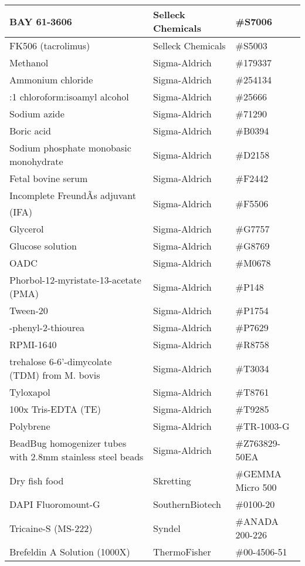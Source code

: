 \begin{center}
\begin{longtable}{|>{\raggedright\arraybackslash}m{3in}|>{\raggedleft\arraybackslash}m{1.5in}|>{\raggedright\arraybackslash}m{1in}|}
\hline
BAY 61-3606 & Selleck Chemicals & \#S7006 \\
\hline
FK506 (tacrolimus) & Selleck Chemicals & \#S5003 \\ 
\hline
Methanol & Sigma-Aldrich & \#179337 \\ 
\hline 
Ammonium chloride & Sigma-Aldrich & \#254134 \\ 
\hline 
24:1 chloroform:isoamyl alcohol & Sigma-Aldrich & \#25666 \\ 
\hline 
Sodium azide & Sigma-Aldrich  & \#71290 \\ 
\hline 
Boric acid & Sigma-Aldrich  & \#B0394 \\ 
\hline 
Sodium phosphate monobasic monohydrate & Sigma-Aldrich  & \#D2158 \\ 
\hline 
Fetal bovine serum & Sigma-Aldrich  & \#F2442 \\ 
\hline 
Incomplete FreundÃs adjuvant (IFA) & Sigma-Aldrich & \#F5506 \\ 
\hline 
Glycerol & Sigma-Aldrich  & \#G7757 \\ 
\hline 
Glucose solution & Sigma-Aldrich  & \#G8769 \\ 
\hline 
OADC & Sigma-Aldrich  & \#M0678 \\ 
\hline 
Phorbol-12-myristate-13-acetate (PMA) & Sigma-Aldrich  & \#P148 \\ 
\hline 
Tween-20 & Sigma-Aldrich  & \#P1754 \\ 
\hline 
1-phenyl-2-thiourea & Sigma-Aldrich  & \#P7629 \\ 
\hline 
RPMI-1640 & Sigma-Aldrich  & \#R8758 \\ 
\hline 
trehalose 6-6'-dimycolate (TDM) from M. bovis & Sigma-Aldrich  & \#T3034 \\ 
\hline 
Tyloxapol & Sigma-Aldrich  & \#T8761 \\ 
\hline 
100x Tris-EDTA (TE) & Sigma-Aldrich  & \#T9285 \\ 
\hline 
Polybrene & Sigma-Aldrich & \#TR-1003-G \\ 
\hline 
BeadBug homogenizer tubes with 2.8mm stainless steel beads & Sigma-Aldrich & \#Z763829-50EA \\ 
\hline 
Dry fish food & Skretting  & \#GEMMA Micro 500 \\ 
\hline 
DAPI Fluoromount-G & SouthernBiotech  & \#0100-20 \\ 
\hline 
Tricaine-S (MS-222) & Syndel  & \#ANADA 200-226 \\ 
\hline 
Brefeldin A Solution (1000X) & ThermoFisher & \#00-4506-51 \\ 

\end{longtable}
\end{center}
